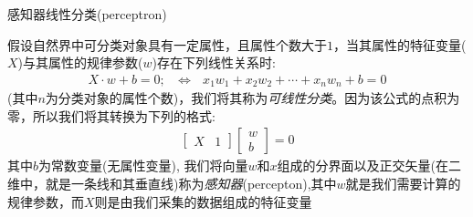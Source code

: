 \documentclass[handout]{beamer}
\begin{document}
\begin{frame}{感知器线性分类(perceptron)}
	\begin{definition}
	假设自然界中可分类对象具有一定属性，且属性个数大于$1$，当其属性的特征变量($X$)与其属性的规律参数($w$)存在下列线性关系时:
	\begin{align*}
		X \cdot w + b  =0 ; \ \ \ \Leftrightarrow \ \ \ x_1 w_1 + x_2 w_2 + \cdots + x_n w_n + b = 0
	\end{align*}
	(其中$n$为分类对象的属性个数)，我们将其称为\textit{可线性分类}。因为该公式的点积为零，所以我们将其转换为下列的格式:
	\begin{align*}
		\begin{bmatrix}
			X & 1
		\end{bmatrix} \begin{bmatrix}
			w \\
			b
		\end{bmatrix} = 0  
	\end{align*}
	其中$b$为常数变量(无属性变量), 我们将向量$w$和$x$组成的分界面以及正交矢量(在二维中，就是一条线和其垂直线)称为\textit{感知器}(percepton),其中$w$就是我们需要计算的规律参数，而$X$则是由我们采集的数据组成的特征变量
	\end{definition}
\end{frame}
\end{document}
